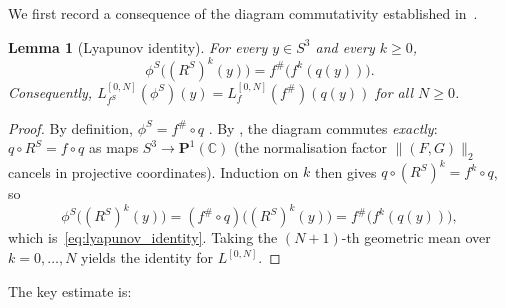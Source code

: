 \documentclass[12pt]{article}
\newtheorem{lemma}[theorem]{Lemma}
\theoremstyle{definition}
\newcommand{\C}{\mathbb{C}}
\newcommand{\Pone}{\mathbf{P}^1(\C)}
\newcommand{\fsh}{f^{\#}}            %
\newcommand{\RS}{R^S}
\begin{document}
We first record a consequence of the diagram commutativity established
in~\cite{Alvarez2023}.

\begin{lemma}[Lyapunov identity]\label{lem:lyapunov_identity}
  For every $y\in S^3$ and every $k\ge 0$,
  \begin{equation}\label{eq:lyapunov_identity}
    \phi^S\!\bigl((\RS)^k(y)\bigr) = \fsh\!\bigl(f^k(q(y))\bigr).
  \end{equation}
  Consequently, $L_{f^S}^{[0,N]}(\phi^S)(y) = L_f^{[0,N]}(\fsh)(q(y))$
  for all $N\ge 0$.
\end{lemma}

\begin{proof}
  By definition, $\phi^S = \fsh\circ q$ \cite[Def.~16]{Alvarez2023}.
  By \cite[Prop.~2]{Alvarez2023}, the diagram commutes \emph{exactly}:
  $q\circ \RS = f\circ q$ as maps $S^3\to\Pone$
  (the normalisation factor $\|(F,G)\|_2$ cancels in projective coordinates).
  Induction on $k$ then gives $q\circ(\RS)^k = f^k\circ q$, so
  \[
    \phi^S\bigl((\RS)^k(y)\bigr)
    = (\fsh\circ q)\bigl((\RS)^k(y)\bigr)
    = \fsh\bigl(f^k(q(y))\bigr),
  \]
  which is~\eqref{eq:lyapunov_identity}.  Taking the $(N+1)$-th geometric
  mean over $k = 0,\ldots,N$ yields the identity for $L^{[0,N]}$.
\end{proof}

The key estimate is:
\end{document}
